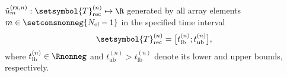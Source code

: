 $\tilde{u}_{m}^{(\text{rx}, n)}: \setsymbol{T}_{ \text{rec} }^{(n)} \mapsto \R$ generated by
all array elements
$m \in \setconsnonneg{ N_{\text{el}} - 1 }$ in
the specified time interval
\begin{equation}
  \setsymbol{T}_{ \text{rec} }^{(n)}
  =
  \bigl[ t_{\text{lb}}^{(n)}; t_{\text{ub}}^{(n)} \bigr],
 \label{eqn:lin_mod_scan_config_volt_rx_obs_interval}
\end{equation}
where
$t_{\text{lb}}^{(n)} \in \Rnonneg$ and
$t_{\text{ub}}^{(n)} > t_{\text{lb}}^{(n)}$ denote
its lower and
upper bounds,
respectively.
